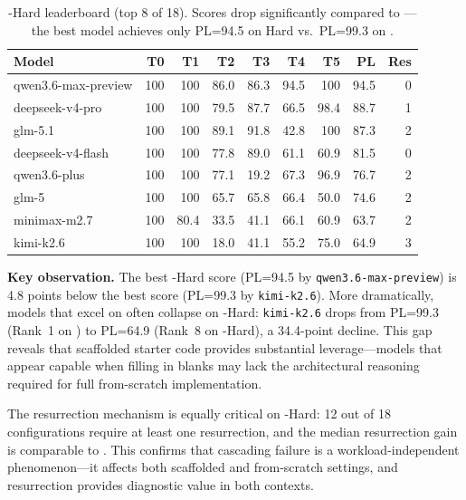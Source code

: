 \begin{table}[t]
\centering
\small
\begin{tabular}{lrrrrrrrr}
\toprule
\textbf{Model} & \textbf{T0} & \textbf{T1} & \textbf{T2} & \textbf{T3} & \textbf{T4} & \textbf{T5} & \textbf{PL} & \textbf{Res} \\
\midrule
qwen3.6-max-preview & 100 & 100 & 86.0 & 86.3 & 94.5 & 100 & 94.5 & 0 \\
deepseek-v4-pro & 100 & 100 & 79.5 & 87.7 & 66.5 & 98.4 & 88.7 & 1 \\
glm-5.1 & 100 & 100 & 89.1 & 91.8 & 42.8 & 100 & 87.3 & 2 \\
deepseek-v4-flash & 100 & 100 & 77.8 & 89.0 & 61.1 & 60.9 & 81.5 & 0 \\
qwen3.6-plus & 100 & 100 & 77.1 & 19.2 & 67.3 & 96.9 & 76.7 & 2 \\
glm-5 & 100 & 100 & 65.7 & 65.8 & 66.4 & 50.0 & 74.6 & 2 \\
minimax-m2.7 & 100 & 80.4 & 33.5 & 41.1 & 66.1 & 60.9 & 63.7 & 2 \\
kimi-k2.6 & 100 & 100 & 18.0 & 41.1 & 55.2 & 75.0 & 64.9 & 3 \\
\bottomrule
\end{tabular}
\caption{\yatcc{}-Hard leaderboard (top 8 of 18). Scores drop significantly compared to \yatcc{}---the best model achieves only PL=94.5 on Hard vs.\ PL=99.3 on \yatcc{}.}
\label{tab:hard}
\end{table}

\textbf{Key observation.}
The best \yatcc{}-Hard score (PL=94.5 by \texttt{qwen3.6-max-preview}) is 4.8 points below the best \yatcc{} score (PL=99.3 by \texttt{kimi-k2.6}).
More dramatically, models that excel on \yatcc{} often collapse on \yatcc{}-Hard: \texttt{kimi-k2.6} drops from PL=99.3 (Rank~1 on \yatcc{}) to PL=64.9 (Rank~8 on \yatcc{}-Hard), a 34.4-point decline.
This gap reveals that scaffolded starter code provides substantial leverage---models that appear capable when filling in blanks may lack the architectural reasoning required for full from-scratch implementation.

The resurrection mechanism is equally critical on \yatcc{}-Hard: 12 out of 18 configurations require at least one resurrection, and the median resurrection gain is comparable to \yatcc{}.
This confirms that cascading failure is a workload-independent phenomenon---it affects both scaffolded and from-scratch settings, and resurrection provides diagnostic value in both contexts.